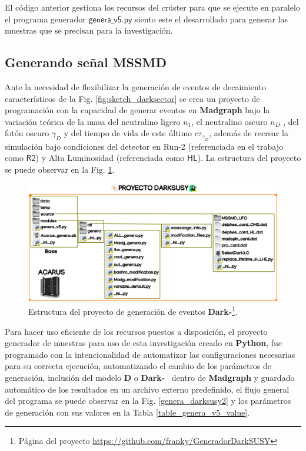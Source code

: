 El código anterior gestiona los recursos del crúster para que se ejecute en paralelo el programa generador $\textsf{genera\_v5.py}$ siento este el desarrollado para generar las muestras que se precisan para la investigación.

\subsection{Generando señal MSSMD}

Ante la necesidad de flexibilizar la generación de eventos de decaimiento característicos de la Fig. \ref{fig:sketch_darksector} se crea un proyecto de programación con la capacidad de generar eventos en \textbf{Madgraph} bajo la variación teórica de la masa del neutralino ligero $n_1$, el neutralino oscuro $n_D$ , del fotón oscuro $\gamma_D$ y del tiempo de vida de este último $c\tau_{\gamma_D}$, además de recrear la simulación bajo condiciones del detector en Run-2 (referenciada en el trabajo como $\textsf{R2}$) y Alta Luminosidad (referenciada como $\textsf{HL}$). La estructura del proyecto se puede observar en la Fig. \ref{genera_darksusy0}.

\begin{figure}[!ht]
\centering
\includegraphics[width=1\textwidth]{Simulacion/imagenes/proyecto_darksusy.png}
\caption[Estructura del proyecto de generación de eventos \textbf{Dark-\SUSY}.]{Estructura del proyecto de generación de eventos \textbf{Dark-\SUSY}\footnote{Página del proyecto \href{https://github.com/franky8939/GeneradorDarkSUSY}{https://\-git\-hub.\-com/\-fran\-ky/\-Ge\-ne\-ra\-dor\-Dark\-SUSY}}.}
\label{genera_darksusy0}
\end{figure}

Para hacer uso eficiente de los recursos puestos a disposición, el proyecto generador de muestras para uso de esta investigación creado en \textbf{Python}, fue programado con la intencionalidad de automatizar las configuraciones necesarias para su correcta ejecución, automatizando el cambio de los parámetros de generación, inclusión del modelo \MSSM \textbf{D} o \textbf{Dark-}\SUSY ~ dentro de \textbf{Madgraph} y guardado automático de los resultados en un archivo externo predefinido, el flujo general del programa se puede observar en la Fig. \ref{genera_darksusy2} y los parámetros de generación con sus valores en la Tabla \ref{table_genera_v5_value}.

